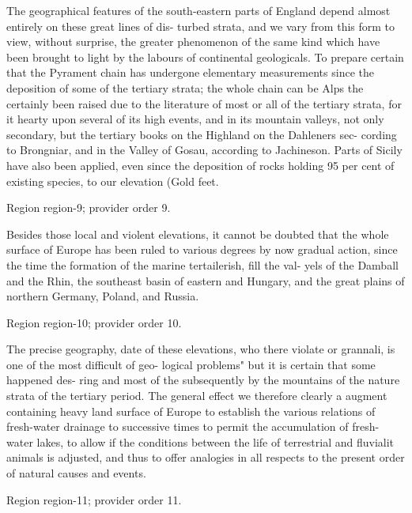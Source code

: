 \documentclass[11pt]{article}
\begin{document}
The geographical features of the south-eastern parts of England depend almost entirely on these great lines of dis- turbed strata, and we vary from this form to view, without surprise, the greater phenomenon of the same kind which have been brought to light by the labours of continental geologicals. To prepare certain that the Pyrament chain has undergone elementary measurements since the deposition of some of the tertiary strata; the whole chain can be Alps the certainly been raised due to the literature of most or all of the tertiary strata, for it hearty upon several of its high events, and in its mountain valleys, not only secondary, but the tertiary books on the Highland on the Dahleners sec- cording to Brongniar, and in the Valley of Gosau, according to Jachineson. Parts of Sicily have also been applied, even since the deposition of rocks holding 95 per cent of existing species, to our elevation (Gold feet.
\par

{\scriptsize\color{gray} Region region-9; provider order 9.\par}
\medskip

Besides those local and violent elevations, it cannot be doubted that the whole surface of Europe has been ruled to various degrees by now gradual action, since the time the formation of the marine tertailerish, fill the val- yels of the Damball and the Rhin, the southeast basin of eastern and Hungary, and the great plains of northern Germany, Poland, and Russia.
\par

{\scriptsize\color{gray} Region region-10; provider order 10.\par}
\medskip

The precise geography, date of these elevations, who there violate or grannali, is one of the most difficult of geo- logical problems" but it is certain that some happened des- ring and most of the subsequently by the mountains of the nature strata of the tertiary period. The general effect we therefore clearly a augment containing heavy land surface of Europe to establish the various relations of fresh-water drainage to successive times to permit the accumulation of fresh-water lakes, to allow if the conditions between the life of terrestrial and fluvialit animals is adjusted, and thus to offer analogies in all respects to the present order of natural causes and events.
\par

{\scriptsize\color{gray} Region region-11; provider order 11.\par}
\medskip
\end{document}
